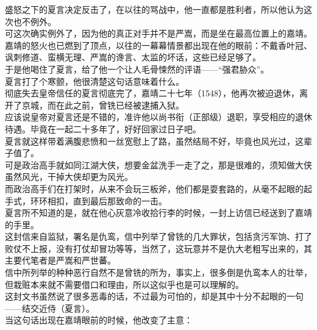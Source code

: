 \begin{multicols}{\theparacolNo}
盛怒之下的夏言决定反击了，在以往的骂战中，他一直都是胜利者，所以他认为这次也不例外。\\

可这次确实例外了，因为他的真正对手并不是严嵩，而是坐在最高位置上的嘉靖。\\

嘉靖的怒火也已燃到了顶点，以往的一幕幕情景都出现在他的眼前：不戴香叶冠、讽刺修道、蛮横无理、严嵩的谗言、太监的坏话，这些已经足够了。\\

于是他喝住了夏言，给了他一个让人毛骨悚然的评语——“强君胁众”。\\

夏言打了个寒颤，他很清楚这句话意味着什么。\\

彻底失去皇帝信任的夏言彻底完了，嘉靖二十七年（1548），他再次被迫退休，离开了京城，而在此之前，曾铣已经被逮捕入狱。\\

应该说皇帝对夏言还是不错的，准许他以尚书衔（正部级）退职，享受相应的退休待遇。毕竟在一起二十多年了，好好回家过日子吧。\\

夏言就这样带着满腹悲愤和一丝宽慰上了路，虽然结局不好，毕竟也风光过，这辈子值了。\\

可是政治高手就如同江湖大侠，想要金盆洗手一走了之，那是很难的，须知做大侠虽然风光，干掉大侠却更为风光。\\

而政治高手们在打架时，从来不会玩三板斧，他们都是耍套路的，从毫不起眼的起手式，环环相扣，直到最后那致命的一击。\\

夏言所不知道的是，就在他心灰意冷收拾行李的时候，一封上访信已经送到了嘉靖的手里。\\

这封信来自监狱，署名是仇鸾，信中列举了曾铣的几大罪状，包括贪污军饷、打了败仗不上报，没有打仗却冒功等等，当然了，这玩意并不是仇大老粗写出来的，其主要代笔者是严嵩和严世蕃。\\

信中所列举的种种恶行自然不是曾铣的所为，事实上，很多倒是仇鸾本人的壮举，但栽赃本来就不需要借口和理由，所以这似乎也是可以理解的。\\

这封文书虽然说了很多恶毒的话，不过最为可怕的，却是其中十分不起眼的一句——结交近侍（夏言）。\\

当这句话出现在嘉靖眼前的时候，他改变了主意：\\


\end{multicols}
